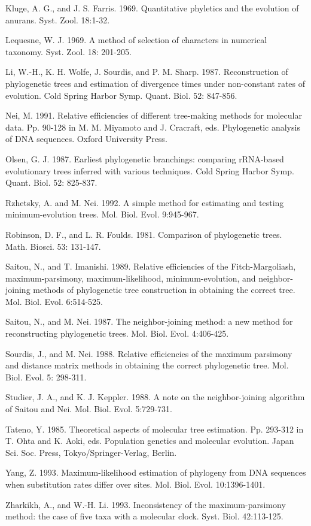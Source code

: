 {{\sc Kluge, A. G.,} and {\sc J. S. Farris.}  1969.  Quantitative
phyletics and the evolution of anurans.  Syst. Zool. 18:1-32.

{\sc Lequesne, W. J.}  1969.  A method of selection of characters in 
numerical taxonomy.  Syst. Zool. 18: 201-205.

{\sc Li, W.-H., K. H. Wolfe, J. Sourdis,} and {\sc P. M. Sharp.}  1987.  
Reconstruction of phylogenetic trees and estimation of 
divergence times under non-constant rates of evolution.  Cold 
Spring Harbor Symp. Quant. Biol. 52: 847-856.

{\sc Nei, M.}  1991.  Relative efficiencies of different tree-making 
methods for molecular data.  Pp. 90-128 in {\sc M. M. Miyamoto} and 
{\sc J. Cracraft}, eds. Phylogenetic analysis of DNA sequences.  
Oxford University Press.

{\sc Olsen, G. J.}  1987.  Earliest phylogenetic branchings:  comparing 
rRNA-based evolutionary trees inferred with various 
techniques.  Cold Spring Harbor Symp. Quant. Biol. 52: 825-837.

{\sc Rzhetsky, A.} and {\sc M. Nei.}  1992.  A simple method for
estimating and testing minimum-evolution trees.  Mol. Biol. Evol.
9:945-967.

{\sc Robinson, D. F.,} and {\sc L. R. Foulds.}  1981.  Comparison of phylogenetic 
trees.  Math. Biosci. 53: 131-147.

{\sc Saitou, N.,} and {\sc T. Imanishi.}  1989.  Relative efficiencies of the 
Fitch-Margoliash, maximum-parsimony, maximum-likelihood, 
minimum-evolution, and neighbor-joining methods of 
phylogenetic tree construction in obtaining the correct tree.  
Mol. Biol. Evol. 6:514-525.

{\sc Saitou, N.,} and {\sc M. Nei.}  1987.  The neighbor-joining method:  a new 
method for reconstructing phylogenetic trees.  Mol. Biol. Evol. 
4:406-425.

{\sc Sourdis, J.,} and {\sc M. Nei.}  1988.  Relative efficiencies of the maximum 
parsimony and distance matrix methods in obtaining the 
correct phylogenetic tree.  Mol. Biol. Evol. 5: 298-311.

{\sc Studier, J. A.,} and {\sc K. J. Keppler.}  1988.  A note on the 
neighbor-joining algorithm of Saitou and Nei.  Mol. Biol. Evol. 5:729-731.

{\sc Tateno, Y.}  1985.  Theoretical aspects of molecular tree estimation.  
Pp. 293-312 in {\sc T. Ohta} and {\sc K. Aoki}, eds. Population genetics 
and molecular evolution.  Japan Sci. Soc. Press, Tokyo/Springer-Verlag, Berlin.

{\sc Yang, Z.}  1993.  Maximum-likelihood estimation of phylogeny from
DNA sequences when substitution rates differ over sites.  Mol. Biol.
Evol. 10:1396-1401.

{\sc Zharkikh, A.,} and {\sc W.-H. Li.}  1993.  Inconsistency of the
maximum-parsimony method:  the case of five taxa with a molecular clock.
Syst. Biol. 42:113-125.

}

